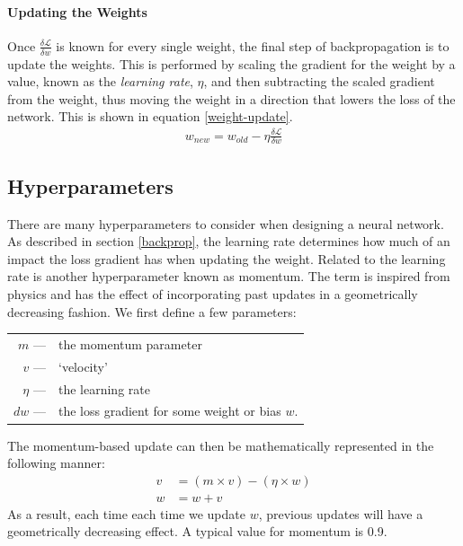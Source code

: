 \paragraph{Updating the Weights}
Once $\frac{\delta \mathcal{L}}{\delta w}$ is known for every single weight, the final step of backpropagation is to update the weights. This is performed by scaling the gradient for the weight by a value, known as the \textit{learning rate}, $\eta$, and then subtracting the scaled gradient from the weight, thus moving the weight in a direction that lowers the loss of the network. This is shown in equation \ref{weight-update}.
\begin{align}
	w_{new} = w_{old} - \eta\frac{\delta \mathcal{L}}{\delta w} \label{weight-update}
\end{align}



\subsection{Hyperparameters}
There are many hyperparameters to consider when designing a neural network. As described in section \ref{backprop}, the learning rate determines how much of an impact the loss gradient has when updating the weight. Related to the learning rate is another hyperparameter known as momentum. The term is inspired from physics and has the effect of incorporating past updates in a geometrically decreasing fashion. We first define a few parameters:
\begin{center}
	\begin{tabular} {r l}
		$m$  \hspace{12pt}---& the momentum parameter\\ 
		$v$  \hspace{12pt}---& `velocity' \\
		$\eta$ \hspace{12pt}---& the learning rate \\
		$dw$ \hspace{12pt}---& the loss gradient for some weight or bias $w$. 
	\end{tabular}
\end{center}The momentum-based update can then be mathematically represented in the following manner:
\begin{align*}
v &=  (m \times v) - (\eta \times w) \\
w &= w + v 
\end{align*}
As a result, each time each time we update $w$, previous updates will have a geometrically decreasing effect. A typical value for momentum is 0.9.

